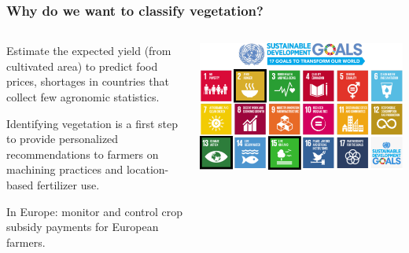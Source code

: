 \documentclass{beamer}
\begin{document}
	\begin{frame}
		\frametitle{Why do we want to classify vegetation?}
		\begin{columns}
			{\scriptsize
			\begin{description}
				\item[Food security] Estimate the expected yield (from cultivated area) to predict food prices, shortages in countries that collect few agronomic statistics.
				\item<2->[Precision Agriculture] Identifying vegetation is a first step to provide personalized recommendations to farmers on machining practices and location-based fertilizer use.
				\item<3->[Subsidy control] In Europe: monitor and control crop subsidy payments for European farmers.
			\end{description}
			}
			\includegraphics[width=\textwidth]{images/sdg_goals.pdf}
		\end{columns}
		
	\end{frame}
\end{document}
